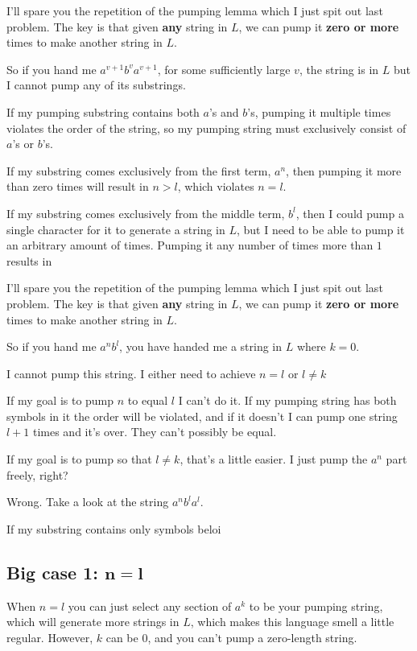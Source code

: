 \documentclass{report}
\begin{document}
\noindent\makebox[\linewidth]{\rule{\paperwidth}{0.4pt}}


I'll spare you the repetition of the pumping lemma which I just spit out last problem.
The key is that given \textbf{any} string in $L$, we can pump it \textbf{zero or more} times to make another string in $L$.

So if you hand me $a^{v+1} b^v a^{v+1}$, for some sufficiently large $v$, the string is in $L$ but I cannot pump any of its substrings.

If my pumping substring contains both $a$'s and $b$'s, pumping it multiple times violates the order of the string, so my pumping string must exclusively consist of $a$'s or $b$'s.

If my substring comes exclusively from the first term, $a^n$, then pumping it more than zero times will result in $n > l$, which violates $n = l$.

If my substring comes exclusively from the middle term, $b^l$, then I could pump a single character for it to generate a string in $L$, but I need to be able to pump it an arbitrary amount of times. Pumping it any number of times more than $1$ results in 


\noindent\makebox[\linewidth]{\rule{\paperwidth}{0.4pt}}

I'll spare you the repetition of the pumping lemma which I just spit out last problem.
The key is that given \textbf{any} string in $L$, we can pump it \textbf{zero or more} times to make another string in $L$.

So if you hand me $a^n b^l$, you have handed me a string in $L$ where $k = 0$.

I cannot pump this string. I either need to achieve $n = l$ or $l \neq k$

If my goal is to pump $n$ to equal $l$ I can't do it. If my pumping string has both symbols in it the order will be violated, and if it doesn't I can pump one string
$l + 1$ times and it's over. They can't possibly be equal.

If my goal is to pump so that $l \neq k$, that's a little easier. I just pump the $a^n$ part freely, right?

Wrong. Take a look at the string $a^n b^l a^l$.

If my substring contains only symbols beloi


\subsection*{Big case 1: $\mathbf{n = l}$}
When $n = l$ you can just select any section of $a^k$ to be your pumping string, which will generate more strings in $L$, which makes this language smell a little regular. 
However, $k$ can be 0, and you can't pump a zero-length string.
\end{document}

